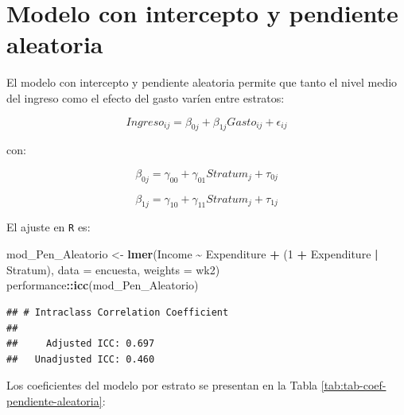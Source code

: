 \documentclass[
  spanish,
  12pt,
]{book}
\newenvironment{Shaded}{\begin{snugshade}}{\end{snugshade}}
\newcommand{\AttributeTok}[1]{\textcolor[rgb]{0.13,0.29,0.53}{#1}}
\newcommand{\DataTypeTok}[1]{\textcolor[rgb]{0.13,0.29,0.53}{#1}}
\newcommand{\DecValTok}[1]{\textcolor[rgb]{0.00,0.00,0.81}{#1}}
\newcommand{\FunctionTok}[1]{\textcolor[rgb]{0.13,0.29,0.53}{\textbf{#1}}}
\newcommand{\NormalTok}[1]{#1}
\newcommand{\OtherTok}[1]{\textcolor[rgb]{0.56,0.35,0.01}{#1}}
\newcommand{\SpecialCharTok}[1]{\textcolor[rgb]{0.81,0.36,0.00}{\textbf{#1}}}
\begin{document}
\section{Modelo con intercepto y pendiente aleatoria}\label{sec-intercepto-pendiente-aleatorios}

El modelo con intercepto y pendiente aleatoria permite que tanto el nivel medio del ingreso como el efecto del gasto varíen entre estratos:

\[
Ingreso_{ij} = \beta_{0j} + \beta_{1j} Gasto_{ij} + \epsilon_{ij}
\]

con:

\[
\beta_{0j} = \gamma_{00} + \gamma_{01} Stratum_j + \tau_{0j}
\]

\[
\beta_{1j} = \gamma_{10} + \gamma_{11} Stratum_j + \tau_{1j}
\]

El ajuste en \texttt{R} es:

\begin{Shaded}
\begin{Highlighting}[]
\NormalTok{mod\_Pen\_Aleatorio }\OtherTok{\textless{}{-}} \FunctionTok{lmer}\NormalTok{(Income }\SpecialCharTok{\textasciitilde{}}\NormalTok{ Expenditure }\SpecialCharTok{+}\NormalTok{ (}\DecValTok{1} \SpecialCharTok{+}\NormalTok{ Expenditure }\SpecialCharTok{|}\NormalTok{ Stratum),}
                          \AttributeTok{data =}\NormalTok{ encuesta, }\AttributeTok{weights =}\NormalTok{ wk2)}
\NormalTok{performance}\SpecialCharTok{::}\FunctionTok{icc}\NormalTok{(mod\_Pen\_Aleatorio)}
\end{Highlighting}
\end{Shaded}

\begin{verbatim}
## # Intraclass Correlation Coefficient
## 
##     Adjusted ICC: 0.697
##   Unadjusted ICC: 0.460
\end{verbatim}

Los coeficientes del modelo por estrato se presentan en la Tabla \ref{tab:tab-coef-pendiente-aleatoria}:

\begin{Shaded}
\end{Shaded}
\end{document}
